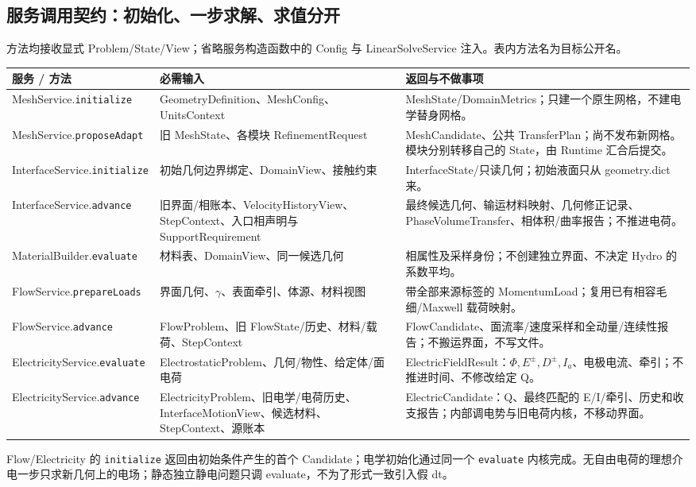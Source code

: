 \documentclass[UTF8,a4paper,11pt,fontset=fandol]{ctexart}
\numberwithin{equation}{section}
\newcommand{\code}[1]{\nolinkurl{#1}}
\begin{document}
\subsection{服务调用契约：初始化、一步求解、求值分开}
方法均接收显式 Problem/State/View；省略服务构造函数中的 Config 与 LinearSolveService 注入。表内方法名为目标公开名。
\begin{longtable}{@{}P{.24\textwidth}P{.34\textwidth}P{.36\textwidth}@{}}
\toprule 服务 / 方法 & 必需输入 & 返回与不做事项\\\midrule\endhead
MeshService.\code{initialize} & GeometryDefinition、MeshConfig、UnitsContext & MeshState/DomainMetrics；只建一个原生网格，不建电学替身网格。\\
MeshService.\code{proposeAdapt} & 旧 MeshState、各模块 RefinementRequest & MeshCandidate、公共 TransferPlan；尚不发布新网格。模块分别转移自己的 State，由 Runtime 汇合后提交。\\
InterfaceService.\code{initialize} & 初始几何边界绑定、DomainView、接触约束 & InterfaceState/只读几何；初始液面只从 geometry.dict 来。\\
InterfaceService.\code{advance} & 旧界面/相账本、VelocityHistoryView、StepContext、入口相声明与 SupportRequirement & 最终候选几何、输运材料映射、几何修正记录、PhaseVolumeTransfer、相体积/曲率报告；不推进电荷。\\
MaterialBuilder.\code{evaluate} & 材料表、DomainView、同一候选几何 & 相属性及采样身份；不创建独立界面、不决定 Hydro 的系数平均。\\
FlowService.\code{prepareLoads} & 界面几何、$\gamma$、表面牵引、体源、材料视图 & 带全部来源标签的 MomentumLoad；复用已有相容毛细/Maxwell 载荷映射。\\
FlowService.\code{advance} & FlowProblem、旧 FlowState/历史、材料/载荷、StepContext & FlowCandidate、面流率/速度采样和全动量/连续性报告；不搬运界面，不写文件。\\
ElectricityService.\code{evaluate} & ElectrostaticProblem、几何/物性、给定体/面电荷 & ElectricFieldResult：$\Phi,E^\pm,D^\pm,I_a$、电极电流、牵引；不推进时间、不修改给定 Q。\\
ElectricityService.\code{advance} & ElectricityProblem、旧电学/电荷历史、InterfaceMotionView、候选材料、StepContext、源账本 & ElectricCandidate：Q、最终匹配的 E/I/牵引、历史和收支报告；内部调电势与旧电荷内核，不移动界面。\\
\bottomrule
\end{longtable}
Flow/Electricity 的 \code{initialize} 返回由初始条件产生的首个 Candidate；电学初始化通过同一个 \code{evaluate} 内核完成。无自由电荷的理想介电一步只求新几何上的电场；静态独立静电问题只调 evaluate，不为了形式一致引入假 dt。
\end{document}
